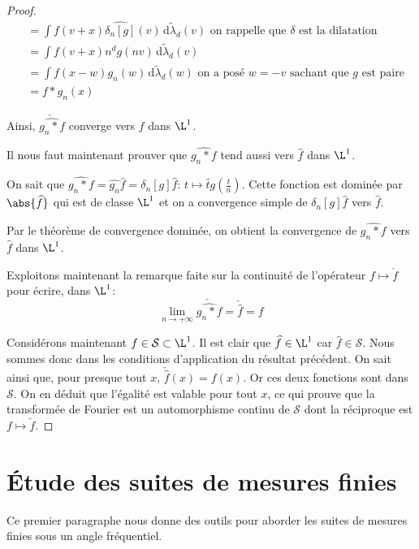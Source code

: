 \begin{proof}
\begin{align*}
 & = \displaystyle{\int}  f(v+x)  \widehat{\delta_n[g]} (v) \, \mathrm d \tilde{\lambda}_d(v) \text{ on rappelle que }\delta \text{ est la dilatation} \\  
 & = \displaystyle{\int}  f(v+x)  n^d g(nv) \, \mathrm d \tilde{\lambda}_d(v) \\
 & = \displaystyle{\int}  f(x-w)  g_n(w) \, \mathrm d \tilde{\lambda}_d(w) \text{ on a posé }w=-v\text{ sachant que }g\text{ est paire}\\
 & = f*g_n(x)
\end{align*}

Ainsi, $\check{\widehat{g_n*f}}$ converge vers $f$ dans $\L^1$. 

\medskip
Il nous faut maintenant prouver que $\widehat{g_n*f}$ tend aussi vers $\widehat{f}$ dans $\L^1$.

On sait que $\widehat{g_n*f} = \widehat{g_n} \widehat{f} = \delta_n[g] \widehat{f}: \, t \mapsto \widehat{t} g\left ( \frac{t}{n}\right )$. Cette fonction est dominée par $\abs{\widehat{f}}$ qui est de classe $\L^1$ et on a convergence simple de $\delta_n[g] \widehat{f}$ vers $\widehat{f}$. 

Par le théorème de convergence dominée, on obtient la convergence de $\widehat{g_n*f}$ vers $\widehat{f}$ dans $\L^1$.

\medskip
Exploitons maintenant la remarque faite sur la continuité de l'opérateur $f \mapsto \check{f}$ pour écrire, dans $\L^1$:
\[
\lim \limits_{n \to +\infty} \check{\widehat{g_n*f}} = \check{\widehat{f}} = f
\]

\medskip
Considérons maintenant $f \in \mathcal{S} \subset \L^1$. Il est clair que $\widehat{f} \in \L^1$ car $\widehat{f} \in \mathcal{S}$. Nous sommes donc dans les conditions d'application du résultat précédent. On sait ainsi que, pour presque tout $x$, $\check{\widehat{f}}(x) = f(x)$. Or ces deux fonctions sont dans $\mathcal{S}$. On en déduit que l'égalité est valable pour tout $x$, ce qui prouve que la transformée de Fourier est un automorphisme continu de $\mathcal{S}$ dont la réciproque est $f \mapsto \check{f}$.
\end{proof}

\section{Étude des suites de mesures finies}

Ce premier paragraphe nous donne des outils pour aborder les suites de mesures finies sous un angle fréquentiel.

